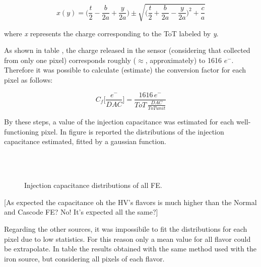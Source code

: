 \begin{equation}
x(y) = \bigg(\frac{t}{2} - \frac{b}{2a} + \frac{y}{2a}\bigg) \pm \sqrt{\bigg(\frac{t}{2} + \frac{b}{2a} - \frac{y}{2a}\bigg)^{2} + \frac{c}{a}}
\end{equation}

where \textit{x} represents the charge corresponding to the ToT labeled by \textit{y}.

As shown in table , the charge released in the sensor (considering that collected from only one pixel) corresponds roughly ($\approx$, approximately) to 1616 $e^{-}$. Therefore it was possible to calculate (estimate) the conversion factor for each pixel as follows:

\begin{equation}
C_{f}\bigg[\frac{e^{-}}{DAC}\bigg] = \frac{1616 \, e^{-}}{ToT \, \frac{DAC}{ToT unit}}
\label{inj_cap}
\end{equation} 

By these steps, a value of the injection capacitance was estimated for each well-functioning pixel. In figure  is reported the distributions of the injection capacitance estimated, fitted by a gaussian function.

\begin{figure}
\centering
{}\quad
{}\\
\quad
{}\\
\caption{Injection capacitance distributions of all FE.}
\label{fig:cap_dist}
\end{figure} 


[As expected the capacitance oh the HV's flavors is much higher than the Normal and Cascode FE? No! It's expected all the same?] 

Regarding the other sources, it was impossibile to fit the distributions for each pixel due to low statistics. For this reason only a mean value for all flavor could be extrapolate. In table  the results obtained with the same method used with the iron source, but considering all pixels of each flavor.

